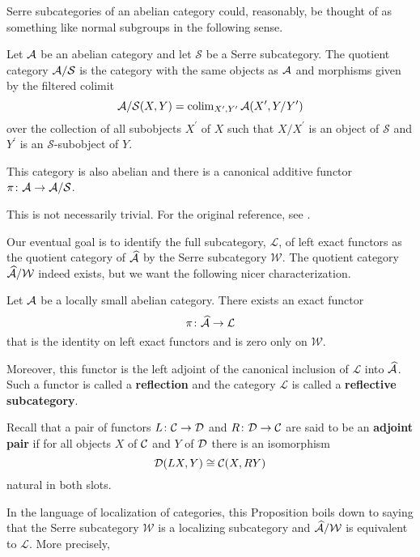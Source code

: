\documentclass[reqno, 12pt]{amsart}
\begin{document}
Serre subcategories of an abelian category could, reasonably, be thought of as something like normal subgroups in the following sense.

\begin{definition}
  Let $\mathcal{A}$ be an abelian category and let $\mathcal{S}$ be a Serre subcategory.
  The quotient category $\mathcal{A}/\mathcal{S}$ is the category with the same objects as $\mathcal{A}$ and morphisms given by the filtered colimit
  $$\mathcal{A}/\mathcal{S}(X,Y) = \operatorname{colim}_{X^\prime, Y^\prime} \mathcal{A}(X^\prime, Y/Y^\prime)$$
  over the collection of all subobjects $X^\prime$ of $X$ such that $X/X^\prime$ is an object of $\mathcal{S}$ and $Y^\prime$ is an $\mathcal{S}$-subobject of $Y$.

  This category is also abelian and there is a canonical additive functor $\pi \colon \mathcal{A} \to \mathcal{A}/\mathcal{S}$.
\end{definition}

\begin{remark}
  This is not necessarily trivial.  For the original reference, see \cite{Ga62}.
\end{remark}

Our eventual goal is to identify the full subcategory, $\mathcal{L}$, of left exact functors as the quotient category of $\widehat{\mathcal{A}}$ by the Serre subcategory $\mathcal{W}$.
The quotient category $\widehat{\mathcal{A}}/\mathcal{W}$ indeed exists, but we want the following nicer characterization.

\begin{proposition}\label{prop: quotient by effaceable is lex}
  Let $\mathcal{A}$ be a locally small abelian category.
  There exists an exact functor
  $$\pi \colon \widehat{\mathcal{A}} \to \mathcal{L}$$
  that is the identity on left exact functors and is zero only on $\mathcal{W}$.

  Moreover, this functor is the left adjoint of the canonical inclusion of $\mathcal{L}$ into $\widehat{\mathcal{A}}$.
  Such a functor is called a \textbf{reflection} and the category $\mathcal{L}$ is called a \textbf{reflective subcategory}.
\end{proposition}

Recall that a pair of functors $L \colon \mathcal{C} \to \mathcal{D}$ and $R \colon \mathcal{D} \to \mathcal{C}$ are said to be an \textbf{adjoint pair} if for all objects $X$ of $\mathcal{C}$ and $Y$ of $\mathcal{D}$ there is an isomorphism
$$\mathcal{D}(LX, Y) \cong \mathcal{C}(X, RY)$$
natural in both slots.

In the language of localization of categories, this Proposition boils down to saying that the Serre subcategory $\mathcal{W}$ is a localizing subcategory and $\widehat{\mathcal{A}}/\mathcal{W}$ is equivalent to $\mathcal{L}$.
More precisely,
\end{document}
